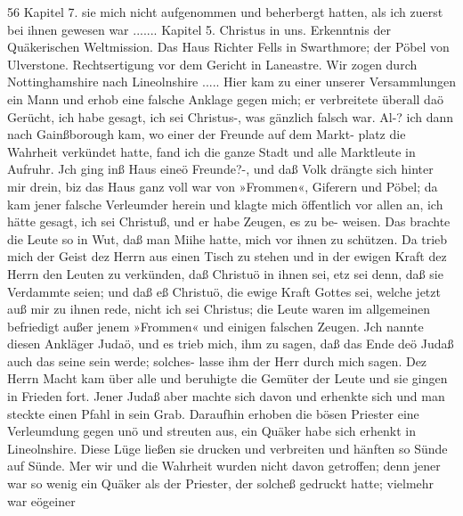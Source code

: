 56 Kapitel 7.
sie mich nicht aufgenommen und beherbergt hatten, als ich zuerst
bei ihnen gewesen war .......
Kapitel 5.
Christus in uns. Erkenntnis der Quäkerischen Weltmission. Das
Haus Richter Fells in Swarthmore; der Pöbel von Ulverstone.
Rechtsertigung vor dem Gericht in Laneastre.
Wir zogen durch Nottinghamshire nach Lineolnshire .....
Hier kam zu einer unserer Versammlungen ein Mann und erhob eine
falsche Anklage gegen mich; er verbreitete überall daö Gerücht, ich
habe gesagt, ich sei Christus-, was gänzlich falsch war. Al-? ich dann
nach Gainßborough kam, wo einer der Freunde auf dem Markt-
platz die Wahrheit verkündet hatte, fand ich die ganze Stadt und
alle Marktleute in Aufruhr. Jch ging inß Haus eineö Freunde?-,
und daß Volk drängte sich hinter mir drein, biz das Haus ganz
voll war von »Frommen«, Giferern und Pöbel; da kam jener
falsche Verleumder herein und klagte mich öffentlich vor allen an,
ich hätte gesagt, ich sei Christuß, und er habe Zeugen, es zu be-
weisen. Das brachte die Leute so in Wut, daß man Miihe hatte,
mich vor ihnen zu schützen. Da trieb mich der Geist dez Herrn
aus einen Tisch zu stehen und in der ewigen Kraft dez Herrn
den Leuten zu verkünden, daß Christuö in ihnen sei, etz sei denn,
daß sie Verdammte seien; und daß eß Christuö, die ewige Kraft
Gottes sei, welche jetzt auß mir zu ihnen rede, nicht ich sei Christus;
die Leute waren im allgemeinen befriedigt außer jenem »Frommen«
und einigen falschen Zeugen. Jch nannte diesen Ankläger Judaö,
und es trieb mich, ihm zu sagen, daß das Ende deö Judaß auch
das seine sein werde; solches- lasse ihm der Herr durch mich sagen.
Dez Herrn Macht kam über alle und beruhigte die Gemüter der
Leute und sie gingen in Frieden fort. Jener Judaß aber machte
sich davon und erhenkte sich und man steckte einen Pfahl in sein
Grab. Daraufhin erhoben die bösen Priester eine Verleumdung
gegen unö und streuten aus, ein Quäker habe sich erhenkt in
Lineolnshire. Diese Lüge ließen sie drucken und verbreiten und
hänften so Sünde auf Sünde. Mer wir und die Wahrheit wurden
nicht davon getroffen; denn jener war so wenig ein Quäker als
der Priester, der solcheß gedruckt hatte; vielmehr war eögeiner


